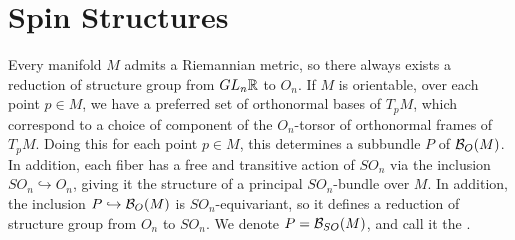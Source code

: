 %
\section{Spin Structures}
%
Every manifold $M$ admits a Riemannian metric, so there always exists a
reduction of structure group from $GL_n\mathbb{R}$ to $O_n$. If $M$ is orientable,
over each point $p \in M$, we have a preferred set of orthonormal bases of
$T_pM$, which correspond to a choice of component of the $O_n$-torsor of
orthonormal frames of $T_pM$. Doing this for each point $p \in M$, this
determines a subbundle $P$ of $\mathcal{B}_O(M)$. In addition, each fiber
has a free and transitive action of $SO_n$ via the inclusion
$SO_n \hookrightarrow O_n$, giving it the structure of a principal $SO_n$-bundle
over $M$. In addition, the inclusion $P \hookrightarrow \mathcal{B}_O(M)$ is
$SO_n$-equivariant, so it defines a reduction of structure group from $O_n$
to $SO_n$. We denote $P = \mathcal{B}_{SO}(M)$, and call it the .

